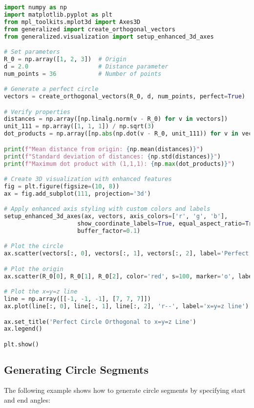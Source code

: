 \begin{lstlisting}[language=Python]
import numpy as np
import matplotlib.pyplot as plt
from mpl_toolkits.mplot3d import Axes3D
from generalized import create_orthogonal_vectors
from generalized.visualization import setup_enhanced_3d_axes

# Set parameters
R_0 = np.array([1, 2, 3])  # Origin
d = 2.0                    # Distance parameter
num_points = 36            # Number of points

# Generate a perfect circle
vectors = create_orthogonal_vectors(R_0, d, num_points, perfect=True)

# Verify properties
distances = np.array([np.linalg.norm(v - R_0) for v in vectors])
unit_111 = np.array([1, 1, 1]) / np.sqrt(3)
dot_products = np.array([np.abs(np.dot(v - R_0, unit_111)) for v in vectors])

print(f"Mean distance from origin: {np.mean(distances)}")
print(f"Standard deviation of distances: {np.std(distances)}")
print(f"Maximum dot product with (1,1,1): {np.max(dot_products)}")

# Create 3D visualization with enhanced features
fig = plt.figure(figsize=(10, 8))
ax = fig.add_subplot(111, projection='3d')

# Apply enhanced axis styling with custom colors and labels
setup_enhanced_3d_axes(ax, vectors, axis_colors=['r', 'g', 'b'], 
                     show_coordinate_labels=True, equal_aspect_ratio=True, 
                     buffer_factor=0.1)

# Plot the circle
ax.scatter(vectors[:, 0], vectors[:, 1], vectors[:, 2], label='Perfect Circle')

# Plot the origin
ax.scatter(R_0[0], R_0[1], R_0[2], color='red', s=100, marker='o', label='Origin R_0')

# Plot the x=y=z line
line = np.array([[-1, -1, -1], [7, 7, 7]])
ax.plot(line[:, 0], line[:, 1], line[:, 2], 'r--', label='x=y=z line')

ax.set_title('Perfect Circle Orthogonal to x=y=z Line')
ax.legend()

plt.show()
\end{lstlisting}

\subsection{Generating Circle Segments}

The following example shows how to generate circle segments by specifying start and end angles:

